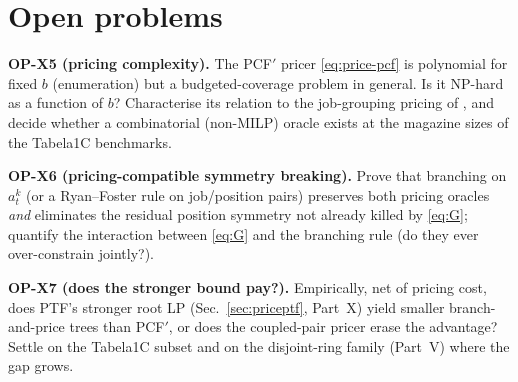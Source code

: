 \documentclass[11pt,a4paper]{article}
\theoremstyle{plain}
\theoremstyle{definition}
\begin{document}
\section{Open problems}\label{sec:op}
\begin{openproblem}
\textbf{OP-X5 (pricing complexity).} The PCF$'$ pricer \eqref{eq:price-pcf} is polynomial for
fixed $b$ (enumeration) but a budgeted-coverage problem in general. Is it NP-hard as a function
of $b$? Characterise its relation to the job-grouping pricing of \citet{Crama1994Column}, and
decide whether a combinatorial (non-MILP) oracle exists at the magazine sizes of the Tabela1C
benchmarks.
\end{openproblem}
\begin{openproblem}
\textbf{OP-X6 (pricing-compatible symmetry breaking).} Prove that branching on $a_t^k$ (or a
Ryan--Foster rule on job/position pairs) preserves both pricing oracles \emph{and} eliminates the
residual position symmetry not already killed by \eqref{eq:G}; quantify the interaction between
\eqref{eq:G} and the branching rule (do they ever over-constrain jointly?).
\end{openproblem}
\begin{openproblem}
\textbf{OP-X7 (does the stronger bound pay?).} Empirically, net of pricing cost, does PTF's
stronger root LP (Sec.~\ref{sec:priceptf}, Part~X) yield smaller branch-and-price trees than
PCF$'$, or does the coupled-pair pricer erase the advantage? Settle on the Tabela1C subset and on
the disjoint-ring family (Part~V) where the gap grows.
\end{openproblem}



\end{document}
